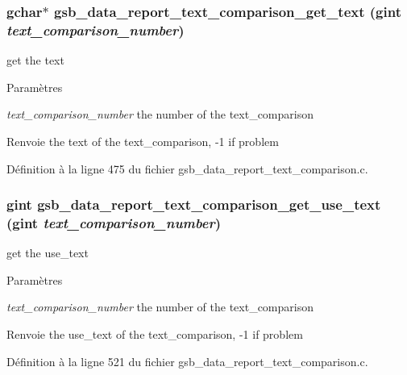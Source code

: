 \subsubsection[{gsb\_\-data\_\-report\_\-text\_\-comparison\_\-get\_\-text}]{\setlength{\rightskip}{0pt plus 5cm}gchar$\ast$ gsb\_\-data\_\-report\_\-text\_\-comparison\_\-get\_\-text (gint {\em text\_\-comparison\_\-number})}\label{gsb__data__report__text__comparison_8c_a787124a1b15143ea18ec069a47fada01}
get the text


\begin{DoxyParams}{Paramètres}
\item[{\em text\_\-comparison\_\-number}]the number of the text\_\-comparison\end{DoxyParams}
\begin{DoxyReturn}{Renvoie}
the text of the text\_\-comparison, -\/1 if problem 
\end{DoxyReturn}


Définition à la ligne 475 du fichier gsb\_\-data\_\-report\_\-text\_\-comparison.c.

\subsubsection[{gsb\_\-data\_\-report\_\-text\_\-comparison\_\-get\_\-use\_\-text}]{\setlength{\rightskip}{0pt plus 5cm}gint gsb\_\-data\_\-report\_\-text\_\-comparison\_\-get\_\-use\_\-text (gint {\em text\_\-comparison\_\-number})}\label{gsb__data__report__text__comparison_8c_a0eb8e0a0e157e3bf8a518a09ab99203e}
get the use\_\-text


\begin{DoxyParams}{Paramètres}
\item[{\em text\_\-comparison\_\-number}]the number of the text\_\-comparison\end{DoxyParams}
\begin{DoxyReturn}{Renvoie}
the use\_\-text of the text\_\-comparison, -\/1 if problem 
\end{DoxyReturn}


Définition à la ligne 521 du fichier gsb\_\-data\_\-report\_\-text\_\-comparison.c.

